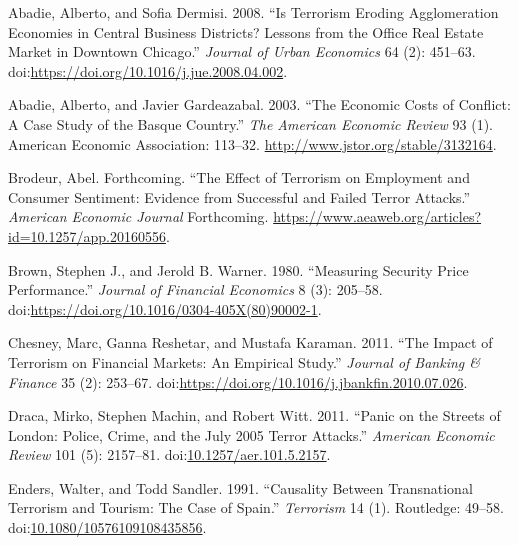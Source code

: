 \documentclass[]{AEA}
\begin{document}


\appendix

\hypertarget{refs}{}
\hypertarget{ref-ABADIE2008451}{}
Abadie, Alberto, and Sofia Dermisi. 2008. ``Is Terrorism Eroding
Agglomeration Economies in Central Business Districts? Lessons from the
Office Real Estate Market in Downtown Chicago.'' \emph{Journal of Urban
Economics} 64 (2): 451--63.
doi:\href{https://doi.org/https://doi.org/10.1016/j.jue.2008.04.002}{https://doi.org/10.1016/j.jue.2008.04.002}.

\hypertarget{ref-10.2307ux2f3132164}{}
Abadie, Alberto, and Javier Gardeazabal. 2003. ``The Economic Costs of
Conflict: A Case Study of the Basque Country.'' \emph{The American
Economic Review} 93 (1). American Economic Association: 113--32.
\url{http://www.jstor.org/stable/3132164}.

\hypertarget{ref-B_forthcoming}{}
Brodeur, Abel. Forthcoming. ``The Effect of Terrorism on Employment and
Consumer Sentiment: Evidence from Successful and Failed Terror
Attacks.'' \emph{American Economic Journal} Forthcoming.
\url{https://www.aeaweb.org/articles?id=10.1257/app.20160556}.

\hypertarget{ref-BROWN1980205}{}
Brown, Stephen J., and Jerold B. Warner. 1980. ``Measuring Security
Price Performance.'' \emph{Journal of Financial Economics} 8 (3):
205--58.
doi:\href{https://doi.org/https://doi.org/10.1016/0304-405X(80)90002-1}{https://doi.org/10.1016/0304-405X(80)90002-1}.

\hypertarget{ref-CHESNEY2011253}{}
Chesney, Marc, Ganna Reshetar, and Mustafa Karaman. 2011. ``The Impact
of Terrorism on Financial Markets: An Empirical Study.'' \emph{Journal
of Banking \& Finance} 35 (2): 253--67.
doi:\href{https://doi.org/https://doi.org/10.1016/j.jbankfin.2010.07.026}{https://doi.org/10.1016/j.jbankfin.2010.07.026}.

\hypertarget{ref-10.1257ux2faer.101.5.2157}{}
Draca, Mirko, Stephen Machin, and Robert Witt. 2011. ``Panic on the
Streets of London: Police, Crime, and the July 2005 Terror Attacks.''
\emph{American Economic Review} 101 (5): 2157--81.
doi:\href{https://doi.org/10.1257/aer.101.5.2157}{10.1257/aer.101.5.2157}.

\hypertarget{ref-doi:10.1080ux2f10576109108435856}{}
Enders, Walter, and Todd Sandler. 1991. ``Causality Between
Transnational Terrorism and Tourism: The Case of Spain.''
\emph{Terrorism} 14 (1). Routledge: 49--58.
doi:\href{https://doi.org/10.1080/10576109108435856}{10.1080/10576109108435856}.
\end{document}
